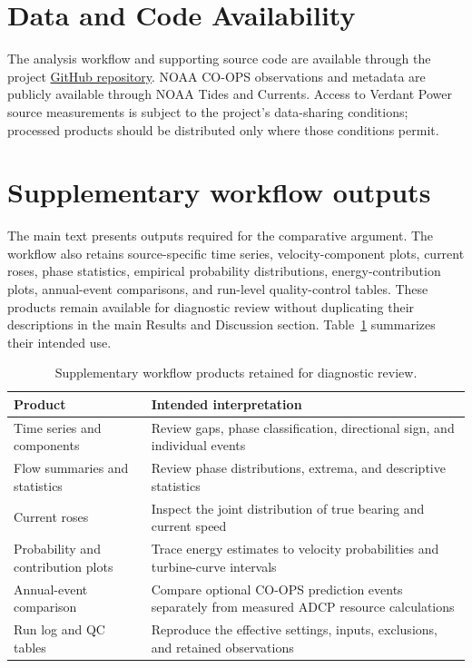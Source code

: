 \documentclass[12pt,sort&compress]{elsarticle}
\begin{document}
\section*{Data and Code Availability}
The analysis workflow and supporting source code are available through the project \href{https://github.com/hosseinsz93/Verdant-SBU-tidal-project}{GitHub repository}. NOAA CO-OPS observations and metadata are publicly available through NOAA Tides and Currents. Access to Verdant Power source measurements is subject to the project's data-sharing conditions; processed products should be distributed only where those conditions permit.

\appendix
\section{Supplementary workflow outputs}
\label{app:outputs}

The main text presents outputs required for the comparative argument. The workflow also retains source-specific time series, velocity-component plots, current roses, phase statistics, empirical probability distributions, energy-contribution plots, annual-event comparisons, and run-level quality-control tables. These products remain available for diagnostic review without duplicating their descriptions in the main Results and Discussion section. Table~\ref{tab:supplementary-outputs} summarizes their intended use.

\begin{table}[tbp]
\centering
\caption{Supplementary workflow products retained for diagnostic review.}
\label{tab:supplementary-outputs}
\begin{tabular}{@{}p{}p{}@{}}
\toprule
Product & Intended interpretation \\
\midrule
Time series and components & Review gaps, phase classification, directional sign, and individual events \\
Flow summaries and statistics & Review phase distributions, extrema, and descriptive statistics \\
Current roses & Inspect the joint distribution of true bearing and current speed \\
Probability and contribution plots & Trace energy estimates to velocity probabilities and turbine-curve intervals \\
Annual-event comparison & Compare optional CO-OPS prediction events separately from measured ADCP resource calculations \\
Run log and QC tables & Reproduce the effective settings, inputs, exclusions, and retained observations \\
\bottomrule
\end{tabular}
\end{table}
\end{document}
